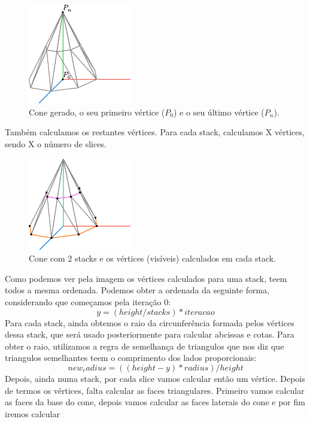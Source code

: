\documentclass[12pt, a4paper]{article}
\begin{document}
\begin{figure}[H]
    \centering
    \includegraphics[width=0.4\textwidth]{res/figures/Cone1.pdf}
    \caption{
        Cone gerado, o seu primeiro vértice ($P_0$) e o seu último vértice ($P_n$).
    }
\end{figure}

Também calculamos os restantes vértices. Para cada stack, calculamos X
vértices, sendo X o número de slices.

\begin{figure}[H]
    \centering
    \includegraphics[width=0.4\textwidth]{res/figures/Cone2.pdf}
    \caption{
        Cone com 2 stacks e os vértices (visíveis) calculados em cada stack.
    }
\end{figure}

Como podemos ver pela imagem os vértices calculados para uma stack,
teem todos a mesma ordenada. Podemos obter a ordenada da seguinte forma,
considerando que começamos pela iteração 0:
$$
y = (height/stacks) * iteracao
$$
Para cada stack, ainda obtemos o raio da circunferência formada pelos vértices dessa stack,
que será usado posteriormente para calcular abcissas e cotas.
Para obter o raio, utilizamos a regra de semelhança de triangulos que nos diz que triangulos
semelhantes teem o comprimento dos lados proporcionais:
$$
new_radius = ((height - y) * radius) / height
$$
Depois, ainda numa stack, por cada slice vamos calcular então um vértice.
Depois de termos os vértices, falta calcular as faces triangulares. Primeiro vamos calcular
as faces da base do cone, depois vamos calcular as faces laterais do cone e por fim iremos
calcular
\end{document}
